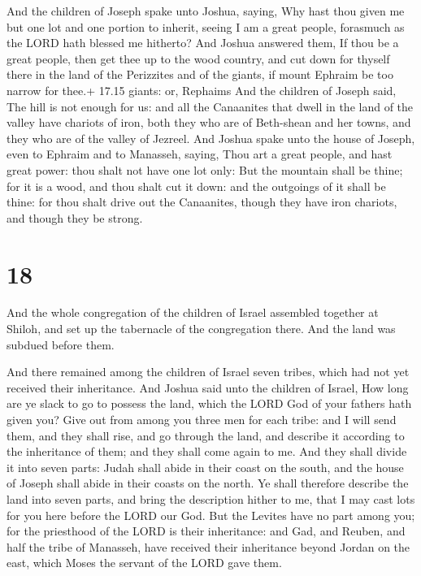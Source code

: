  And the children of Joseph spake unto Joshua, saying, Why
hast thou given me but one lot and one portion to inherit, seeing I am a
great people, forasmuch as the LORD hath blessed me hitherto?
 And Joshua answered them, If thou be a great people, then
get thee up to the wood country, and cut down for thyself there in the
land of the Perizzites and of the giants, if mount Ephraim be too narrow
for thee.+ 17.15 giants: or, Rephaims  And the children of
Joseph said, The hill is not enough for us: and all the Canaanites that
dwell in the land of the valley have chariots of iron, both they who are
of Beth-shean and her towns, and they who are of the valley of Jezreel.
 And Joshua spake unto the house of Joseph, even to Ephraim
and to Manasseh, saying, Thou art a great people, and hast great power:
thou shalt not have one lot only:  But the mountain shall
be thine; for it is a wood, and thou shalt cut it down: and the
outgoings of it shall be thine: for thou shalt drive out the Canaanites,
though they have iron chariots, and though they be strong.

\hypertarget{section-17}{%
\section{18}\label{section-17}}

 And the whole congregation of the children of Israel
assembled together at Shiloh, and set up the tabernacle of the
congregation there. And the land was subdued before them.

 And there remained among the children of Israel seven
tribes, which had not yet received their inheritance.  And
Joshua said unto the children of Israel, How long are ye slack to go to
possess the land, which the LORD God of your fathers hath given you?
 Give out from among you three men for each tribe: and I
will send them, and they shall rise, and go through the land, and
describe it according to the inheritance of them; and they shall come
again to me.  And they shall divide it into seven parts:
Judah shall abide in their coast on the south, and the house of Joseph
shall abide in their coasts on the north.  Ye shall
therefore describe the land into seven parts, and bring the description
hither to me, that I may cast lots for you here before the LORD our God.
 But the Levites have no part among you; for the priesthood
of the LORD is their inheritance: and Gad, and Reuben, and half the
tribe of Manasseh, have received their inheritance beyond Jordan on the
east, which Moses the servant of the LORD gave them.

